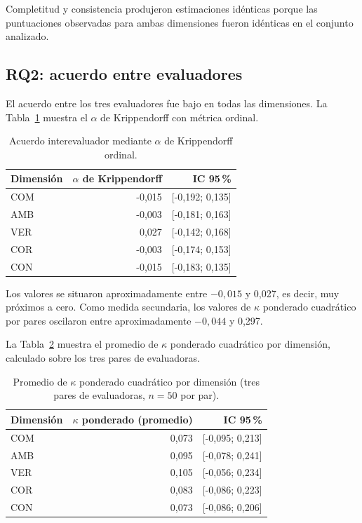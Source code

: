 \documentclass[runningheads]{llncs}
\begin{document}
Completitud y consistencia produjeron estimaciones id\'enticas porque las
puntuaciones observadas para ambas dimensiones fueron id\'enticas en el conjunto
analizado.

\subsection{RQ2: acuerdo entre evaluadores}

El acuerdo entre los tres evaluadores fue bajo en todas las dimensiones. La
Tabla~\ref{tab:rq2} muestra el $\alpha$ de Krippendorff con m\'etrica ordinal.

\begin{table}[ht]
\centering
\caption{Acuerdo interevaluador mediante $\alpha$ de Krippendorff ordinal.}
\label{tab:rq2}
\begin{tabular}{lrr}
\hline
Dimensi\'on & $\alpha$ de Krippendorff & IC 95\,\% \\
\hline
COM & -0,015 & [-0,192; 0,135] \\
AMB & -0,003 & [-0,181; 0,163] \\
VER & 0,027 & [-0,142; 0,168] \\
COR & -0,003 & [-0,174; 0,153] \\
CON & -0,015 & [-0,183; 0,135] \\
\hline
\end{tabular}
\end{table}

Los valores se situaron aproximadamente entre $-0,015$ y 0,027, es decir, muy
pr\'oximos a cero. Como medida secundaria, los valores de $\kappa$ ponderado
cuadr\'atico por pares oscilaron entre aproximadamente $-0,044$ y 0,297.

La Tabla~\ref{tab:kappa} muestra el promedio de $\kappa$ ponderado cuadr\'atico
por dimensi\'on, calculado sobre los tres pares de evaluadoras.

\begin{table}[ht]
\centering
\caption{Promedio de $\kappa$ ponderado cuadr\'atico por dimensi\'on (tres pares de evaluadoras, $n=50$ por par).}
\label{tab:kappa}
\begin{tabular}{lrr}
\hline
Dimensi\'on & $\kappa$ ponderado (promedio) & IC 95\,\% \\
\hline
COM & 0,073 & [-0,095; 0,213] \\
AMB & 0,095 & [-0,078; 0,241] \\
VER & 0,105 & [-0,056; 0,234] \\
COR & 0,083 & [-0,086; 0,223] \\
CON & 0,073 & [-0,086; 0,206] \\
\hline
\end{tabular}
\end{table}
\end{document}
